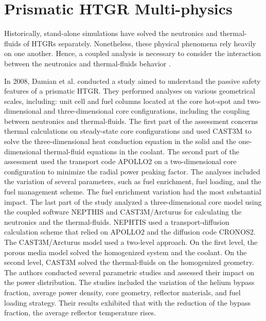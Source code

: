 \section{Prismatic HTGR Multi-physics}
\label{sec:litreview-multi}

Historically, stand-alone simulations have solved the neutronics and thermal-fluids of HTGRs separately.
Nonetheless, these physical phenomena rely heavily on one another.
Hence, a coupled analysis is necessary to consider the interaction between the neutronics and thermal-fluids behavior \cite{tak_cappgamma_2016}.

In 2008, Damian et al. \cite{damian_vhtr_2008} conducted a study aimed to understand the passive safety features of a prismatic \gls{HTGR}.
They performed analyses on various geometrical scales, including: unit cell and fuel columns located at the core hot-spot and two-dimensional and three-dimensional core configurations, including the coupling between neutronics and thermal-fluids.
The first part of the assessment concerns thermal calculations on steady-state core configurations and used CAST3M \cite{studer_cast3marcturus_2007} to solve the three-dimensional heat conduction equation in the solid and the one-dimensional thermal-fluid equations in the coolant.
The second part of the assessment used the transport code APOLLO2 \cite{sanchez_apollo2_1999} on a two-dimensional core configuration to minimize the radial power peaking factor.
The analyses included the variation of several parameters, such as fuel enrichment, fuel loading, and the fuel management scheme.
The fuel enrichment variation had the most substantial impact.
The last part of the study analyzed a three-dimensional core model using the coupled software NEPTHIS \cite{cavalier_presentation_2005} and CAST3M/Arcturus for calculating the neutronics and the thermal-fluids.
NEPHTIS used a transport-diffusion calculation scheme that relied on APOLLO2 and the diffusion code CRONOS2.
The CAST3M/Arcturus model used a two-level approach.
On the first level, the porous media model solved the homogenized system and the coolant.
On the second level, CAST3M solved the thermal-fluids on the homogenized geometry.
The authors conducted several parametric studies and assessed their impact on the power distribution.
The studies included the variation of the helium bypass fraction, average power density, core geometry, reflector materials, and fuel loading strategy.
Their results exhibited that with the reduction of the bypass fraction, the average reflector temperature rises.

